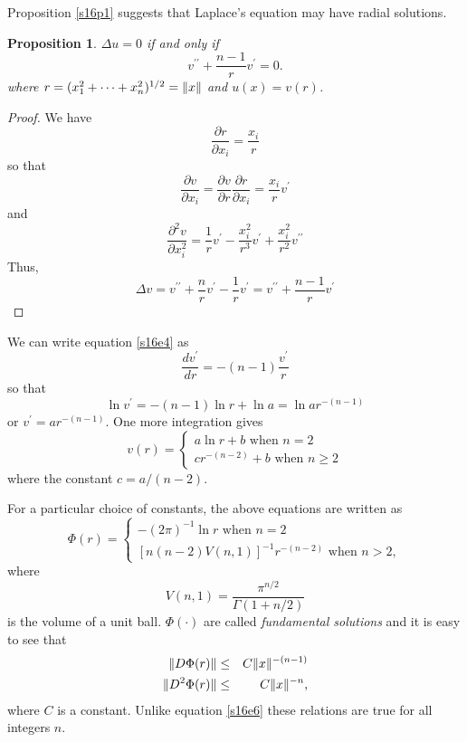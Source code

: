 \documentclass{article}
\newcommand{\td}[2]{\frac{d{#1}}{d{#2}}}
\newcommand{\pd}[2]{\frac{\partial{#1}}{\partial{#2}}}
\DeclarePairedDelimiter\norm{\lVert}{\rVert}
\theoremstyle{plain}
\numberwithin{thm}{section}
\theoremstyle{plain}
\newtheorem{prop}{Proposition}
\numberwithin{prop}{section}
\theoremstyle{definition}
\numberwithin{defn}{section}
\theoremstyle{remark}
\numberwithin{equation}{section}
\begin{document}
\noindent Proposition \ref{s16p1} suggests that Laplace's equation may have radial solutions.
\begin{prop}\label{s16p2}
$\Delta u = 0$ if and only if 
\begin{equation}\label{s16e4}
v^{\prime\prime} + \frac{n-1}{r}v^\prime = 0.
\end{equation}
where $r = (x_1^2 + \cdots + x_n^2)^{1/2} = \norm{x}$ and $u(x) = v(r)$.
\end{prop}
\begin{proof}
We have
\[
\pd{r}{x_i} = \frac{x_i}{r}
\]
so that
\[
\pd{v}{x_i} = \pd{v}{r}\pd{r}{x_i} = \frac{x_i}{r}v^\prime
\]
and
\[
\frac{\partial^2 v}{\partial x_i^2} = \frac{1}{r}v^\prime - \frac{x_i^2}{r^3}v^\prime + 
\frac{x_i^2}{r^2}v^{\prime\prime}
\]
Thus,
\[
\Delta v = v^{\prime\prime} + \frac{n}{r}v^\prime - \frac{1}{r}v^\prime = 
v^{\prime\prime} + \frac{n - 1}{r}v^\prime
\]
\end{proof}

\noindent We can write equation \eqref{s16e4} as
\[
\td{v^\prime}{r} = -(n-1)\frac{v^\prime}{r}
\]
so that
\[
\ln v^\prime = -(n-1)\ln r + \ln a = \ln ar^{-(n-1)}
\]
or $v^\prime = ar^{-(n-1)}$. One more integration gives
\begin{equation}\label{s16e5}
v(r) = \begin{cases}
a\ln r + b \text{ when } n = 2 \\
cr^{-(n-2)} + b \text { when } n \ge 2
\end{cases}
\end{equation}
where the constant $c = a/(n - 2)$.

For a particular choice of constants, the above equations are written as
\begin{equation}\label{s16e6}
\Phi(r) = \begin{cases}
-(2\pi)^{-1}\ln r \text{ when } n = 2 \\
[n(n-2)V(n, 1)]^{-1} r^{-(n - 2)} \text{ when } n > 2,
\end{cases}
\end{equation}
where
\begin{equation}\label{s16e7}
V(n, 1) = \frac{\pi^{n/2}}{\Gamma(1 + n/2)}
\end{equation}
is the volume of a unit ball. $\Phi(\cdot)$ are called \emph{fundamental solutions} and it is easy
to see that
\begin{eqnarray}
\norm{D\Phi(r)} &\le& C\norm{x}^{-(n-1)} \label{s16e8} \\
\norm{D^2\Phi(r)} &\le& C\norm{x}^{-n} \label{s16e9},
\end{eqnarray}
where $C$ is a constant. Unlike equation \eqref{s16e6} these relations are true for all integers $n$.
\end{document}
